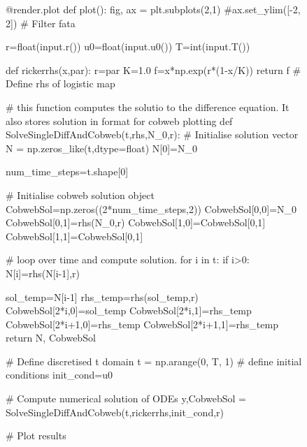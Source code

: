 \documentclass[
  letterpaper,
  DIV=11,
  numbers=noendperiod]{scrreprt}
\newenvironment{Shaded}{\begin{snugshade}}{\end{snugshade}}
\newcommand{\NormalTok}[1]{\textcolor[rgb]{0.00,0.23,0.31}{#1}}
\begin{document}
\begin{figure}
{\begin{Shaded}
\begin{Highlighting}[]
\NormalTok{    @render.plot}
\NormalTok{    def plot():}
\NormalTok{        fig, ax = plt.subplots(2,1)}
\NormalTok{        \#ax.set\_ylim([{-}2, 2])}
\NormalTok{        \# Filter fata}
        
        
\NormalTok{        r=float(input.r())}
\NormalTok{        u0=float(input.u0())}
\NormalTok{        T=int(input.T())}
        
\NormalTok{        def rickerrhs(x,par):}
\NormalTok{          r=par}
\NormalTok{          K=1.0}
\NormalTok{          f=x*np.exp(r*(1{-}x/K))}
\NormalTok{          return f}
\NormalTok{        \# Define rhs of logistic map }
     
\NormalTok{        \# this function computes the solutio to the difference equation. It also stores solution in format for cobweb plotting}
\NormalTok{        def SolveSingleDiffAndCobweb(t,rhs,N\_0,r):}
\NormalTok{          \# Initialise solution vector}
\NormalTok{          N = np.zeros\_like(t,dtype=float)}
\NormalTok{          N[0]=N\_0}


\NormalTok{          num\_time\_steps=t.shape[0]}


\NormalTok{          \# Initialise cobweb solution object}
\NormalTok{          CobwebSol=np.zeros((2*num\_time\_steps,2))}
\NormalTok{          CobwebSol[0,0]=N\_0}
\NormalTok{          CobwebSol[0,1]=rhs(N\_0,r)}
\NormalTok{          CobwebSol[1,0]=CobwebSol[0,1]}
\NormalTok{          CobwebSol[1,1]=CobwebSol[0,1]}

\NormalTok{          \# loop over time and compute solution.}
\NormalTok{          for i in t:}
\NormalTok{            if i\textgreater{}0:}
\NormalTok{              N[i]=rhs(N[i{-}1],r) }

\NormalTok{              sol\_temp=N[i{-}1]}
\NormalTok{              rhs\_temp=rhs(sol\_temp,r)}
\NormalTok{              CobwebSol[2*i,0]=sol\_temp}
\NormalTok{              CobwebSol[2*i,1]=rhs\_temp}
\NormalTok{              CobwebSol[2*i+1,0]=rhs\_temp}
\NormalTok{              CobwebSol[2*i+1,1]=rhs\_temp}
\NormalTok{          return N, CobwebSol}

\NormalTok{        \# Define discretised t domain}
\NormalTok{        t = np.arange(0, T, 1)}
\NormalTok{        \# define initial conditions}
\NormalTok{        init\_cond=u0}
        
\NormalTok{        \# Compute numerical solution of ODEs}
\NormalTok{        y,CobwebSol = SolveSingleDiffAndCobweb(t,rickerrhs,init\_cond,r)}

\NormalTok{        \# Plot results}
        

\end{Highlighting}
\end{Shaded}}
\end{figure}
\end{document}
